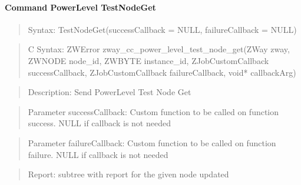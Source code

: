 \paragraph{Command PowerLevel TestNodeGet}
\begin{quote}Syntax: TestNodeGet(successCallback = NULL, failureCallback = NULL)\end{quote}
\begin{quote}C Syntax: ZWError zway\_cc\_power\_level\_test\_node\_get(ZWay zway, ZWNODE node\_id, ZWBYTE instance\_id, ZJobCustomCallback successCallback, ZJobCustomCallback failureCallback, void* callbackArg)\end{quote}
\begin{quote}Description: Send PowerLevel Test Node Get\end{quote}
\begin{quote}Parameter successCallback: Custom function to be called on function success. NULL if callback is not needed\end{quote}
\begin{quote}Parameter failureCallback: Custom function to be called on function failure. NULL if callback is not needed\end{quote}
\begin{quote}Report: subtree with report for the given node updated\end{quote}

